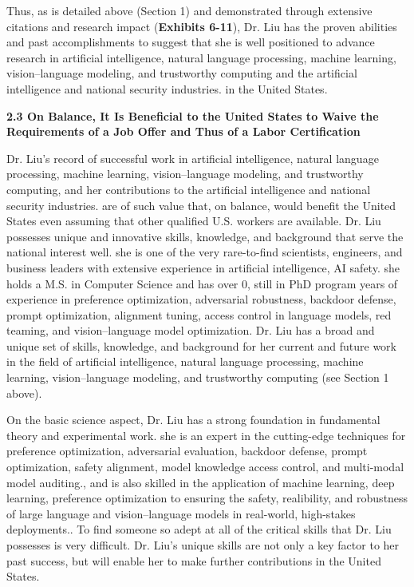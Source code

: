 \documentclass{article}
\begin{document}
Thus, as is detailed above (Section 1) and demonstrated through extensive citations and research impact (\textbf{Exhibits 6-11}), Dr. Liu has the proven abilities and past accomplishments to suggest that she is well positioned to advance research in artificial intelligence, natural language processing, machine learning, vision–language modeling, and trustworthy computing and the artificial intelligence and national security industries. in the United States.



{\bf 2.3 On Balance, It Is Beneficial to the United States to Waive the Requirements of a Job Offer and Thus of a Labor Certification}

Dr. Liu's record of successful work in artificial intelligence, natural language processing, machine learning, vision–language modeling, and trustworthy computing, and her contributions to the artificial intelligence and national security industries. are of such value that, on balance, would benefit the United States even assuming that other qualified U.S. workers are available. Dr. Liu possesses unique and innovative skills, knowledge, and background that serve the national interest well. she is one of the very rare-to-find scientists, engineers, and business leaders with extensive experience in artificial intelligence, AI safety. she holds a M.S. in Computer Science and has over 0, still in PhD program years of experience in preference optimization, adversarial robustness, backdoor defense, prompt optimization, alignment tuning, access control in language models, red teaming, and vision–language model optimization. Dr. Liu has a broad and unique set of skills, knowledge, and background for her current and future work in the field of artificial intelligence, natural language processing, machine learning, vision–language modeling, and trustworthy computing (see Section 1 above).

On the basic science aspect, Dr. Liu has a strong foundation in fundamental theory and experimental work. she is an expert in the cutting-edge techniques for preference optimization, adversarial evaluation, backdoor defense, prompt optimization, safety alignment, model knowledge access control, and multi-modal model auditing., and is also skilled in the application of machine learning, deep learning, preference optimization to ensuring the safety, realibility, and robustness of large language and vision–language models in real-world, high-stakes deployments.. To find someone so adept at all of the critical skills that Dr. Liu possesses is very difficult. Dr. Liu's unique skills are not only a key factor to her past success, but will enable her to make further contributions in the United States.
\end{document}
